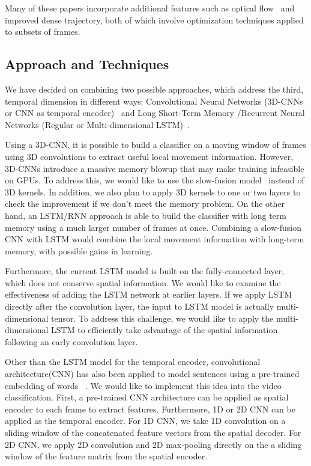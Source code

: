 Many of these papers incorporate additional features such as optical flow~\cite{brox} and improved dense trajectory, both of which involve optimization techniques applied to subsets of frames. 
\subsection*{Approach and Techniques}
We have decided on combining two possible approaches, which address
the third, temporal dimension in different ways: Convolutional Neural
Networks (3D-CNNs or CNN as temporal encoder)~\cite{stf,cnnvid,cnnMNLS} and Long
Short-Term Memory /Recurrent Neural Networks (Regular or Multi-dimensional LSTM)~\cite{ltrcn}. 

Using a 3D-CNN, it is possible to build a classifier on a moving window
of frames using 3D convolutions to extract useful local movement information. However, 3D-CNNs introduce a massive memory blowup that may make training infeasible on GPUs.
To address this, we would like to use the slow-fusion model~\cite{cnnvid} instead of 3D kernels. In addition, we also plan to apply 3D kernels to one or two layers to check the improvement if we don't meet the memory problem. On the other hand, an LSTM/RNN approach is able to build the classifier with long term memory using a much larger number of frames at once. Combining a slow-fusion CNN with LSTM would combine the local movement information with long-term memory, with possible gains in learning.


Furthermore, the current LSTM model is built on the fully-connected
layer, which does not conserve spatial information. We would like to examine the 
effectiveness of adding the LSTM network at earlier layers.
If we apply LSTM directly after the convolution layer,
the input to LSTM model is actually multi-dimensional tensor. To address
this challenge, we would like to apply the multi-dimensional LSTM
\cite{byeon2015scene} to efficiently take advantage of the spatial
information following an early convolution layer. 

Other than the LSTM model for the temporal encoder, convolutional architecture(CNN) has also been applied to model sentences using a pre-trained embedding of words ~\cite{cnnSC,cnnMNLS}. We would like to implement this idea into the video classification. First, a pre-trained CNN architecture can be applied as spatial encoder to each frame to extract features. Furthermore, 1D or 2D CNN can be applied as the temporal encoder. For 1D CNN, we take 1D convolution on a sliding window of the concatenated feature vectors from the spatial decoder. For 2D CNN, we apply 2D convolution and 2D max-pooling directly on the a sliding window of the feature matrix from the spatial encoder. 

